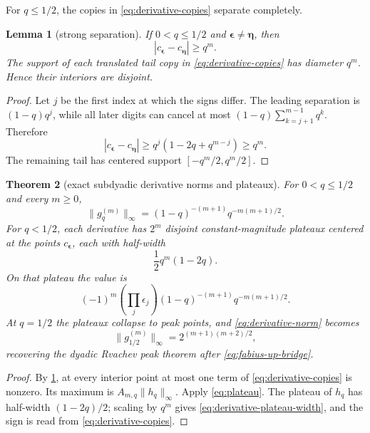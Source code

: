 \documentclass[11pt,oneside]{article}
\newtheorem{theorem}{Theorem}[section]
\newtheorem{lemma}[theorem]{Lemma}
\theoremstyle{definition}
\theoremstyle{remark}
\begin{document}
For $q\le1/2$, the copies in \cref{eq:derivative-copies} separate completely.

\begin{lemma}[strong separation]\label{lem:center-separation}
If $0<q\le1/2$ and $\bm\epsilon\ne\bm\eta$, then
\[
 |c_{\bm\epsilon}-c_{\bm\eta}|\ge q^m.
\]
The support of each translated tail copy in \cref{eq:derivative-copies} has diameter $q^m$.  Hence their interiors are disjoint.
\end{lemma}

\begin{proof}
Let $j$ be the first index at which the signs differ.  The leading separation is $(1-q)q^j$, while all later digits can cancel at most
$(1-q)\sum_{k=j+1}^{m-1}q^k$.  Therefore
\[
 |c_{\bm\epsilon}-c_{\bm\eta}|
 \ge q^j(1-2q+q^{m-j})\ge q^m.
\]
The remaining tail has centered support $[-q^m/2,q^m/2]$.
\end{proof}

\begin{theorem}[exact subdyadic derivative norms and plateaux]\label{thm:derivative-norm}
For $0<q\le1/2$ and every $m\ge0$,
\begin{equation}\label{eq:derivative-norm}
 \boxed{\quad
 \|g_q^{(m)}\|_\infty
 =(1-q)^{-(m+1)}q^{-m(m+1)/2}.
 \quad}
\end{equation}
For $q<1/2$, each derivative has $2^m$ disjoint constant-magnitude plateaux centered at the points $c_{\bm\epsilon}$, each with half-width
\begin{equation}\label{eq:derivative-plateau-width}
 \frac12q^m(1-2q).
\end{equation}
On that plateau the value is
\begin{equation}\label{eq:derivative-plateau-value}
 (-1)^m\left(\prod_j\epsilon_j\right)
 (1-q)^{-(m+1)}q^{-m(m+1)/2}.
\end{equation}
At $q=1/2$ the plateaux collapse to peak points, and \cref{eq:derivative-norm} becomes
\[
 \|g_{1/2}^{(m)}\|_\infty=2^{(m+1)(m+2)/2},
\]
recovering the dyadic Rvachev peak theorem after \cref{eq:fabius-up-bridge}.
\end{theorem}

\begin{proof}
By \cref{lem:center-separation}, at every interior point at most one term of \cref{eq:derivative-copies} is nonzero.  Its maximum is $A_{m,q}\|h_q\|_\infty$.  Apply \cref{eq:plateau}.  The plateau of $h_q$ has half-width $(1-2q)/2$; scaling by $q^m$ gives \cref{eq:derivative-plateau-width}, and the sign is read from \cref{eq:derivative-copies}.
\end{proof}
\end{document}
